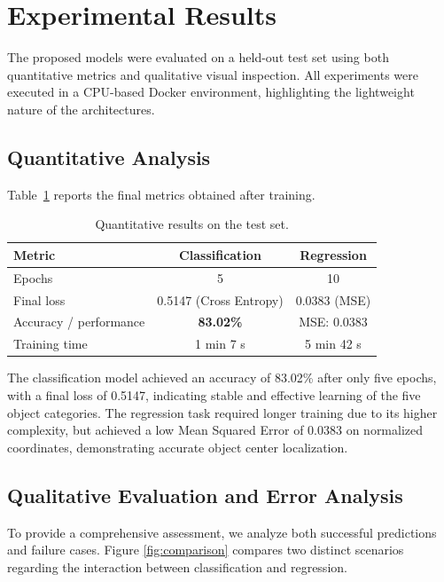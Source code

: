 \documentclass[a4paper,11pt]{article}
\begin{document}
\section{Experimental Results}

The proposed models were evaluated on a held-out test set using both quantitative
metrics and qualitative visual inspection. All experiments were executed in a
CPU-based Docker environment, highlighting the lightweight nature of the
architectures.

\subsection{Quantitative Analysis}

Table~\ref{tab:results} reports the final metrics obtained after training.

\begin{table}[h]
\centering
\begin{tabular}{|l|c|c|}
\hline
\textbf{Metric} & \textbf{Classification} & \textbf{Regression} \\
\hline
Epochs & 5 & 10 \\
Final loss & 0.5147 (Cross Entropy) & 0.0383 (MSE) \\
Accuracy / performance & \textbf{83.02\%} & MSE: 0.0383 \\
Training time & 1 min 7 s & 5 min 42 s \\
\hline
\end{tabular}
\caption{Quantitative results on the test set.}
\label{tab:results}
\end{table}

The classification model achieved an accuracy of 83.02\% after only five epochs,
with a final loss of 0.5147, indicating stable and effective learning of the five
object categories. The regression task required longer training due to its
higher complexity, but achieved a low Mean Squared Error of 0.0383 on normalized
coordinates, demonstrating accurate object center localization.

\subsection{Qualitative Evaluation and Error Analysis}
To provide a comprehensive assessment, we analyze both successful predictions and failure cases. Figure \ref{fig:comparison} compares two distinct scenarios regarding the interaction between classification and regression.
\end{document}
